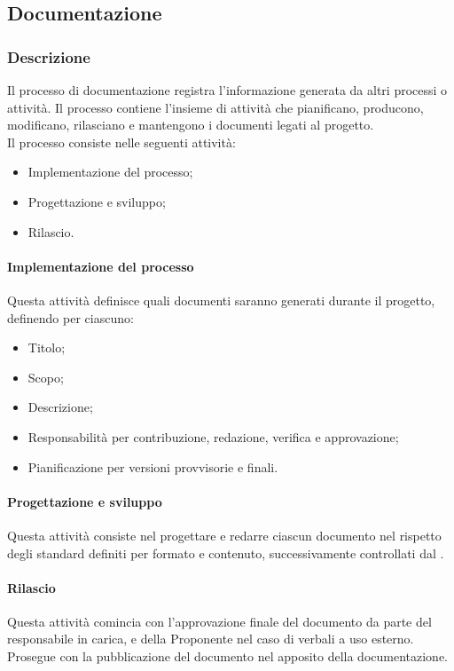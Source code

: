 \subsection{Documentazione}

\subsubsection{Descrizione}
Il processo di documentazione registra l'informazione generata da altri processi o attività. Il processo contiene l'insieme di attività che pianificano, producono, modificano, rilasciano e mantengono i documenti legati al progetto.\\
Il processo consiste nelle seguenti attività:
\begin{itemize}
  \item Implementazione del processo;
  \item Progettazione e sviluppo;
  \item Rilascio.
\end{itemize}

\paragraph{Implementazione del processo}\label{implementazioneprocessodocumentazione}
\par Questa attività definisce quali documenti saranno generati durante il progetto, definendo per ciascuno:
\begin{itemize}
  \item Titolo;
  \item Scopo;
  \item Descrizione;
  \item Responsabilità per contribuzione, redazione, verifica e approvazione;
  \item Pianificazione per versioni provvisorie e finali.
\end{itemize}

\paragraph{Progettazione e sviluppo}
\par Questa attività consiste nel progettare e redarre ciascun documento nel rispetto degli standard definiti per formato e contenuto, successivamente controllati dal \Verificatore{}.

\paragraph{Rilascio}
\par Questa attività comincia con l'approvazione finale del documento da parte del responsabile in carica, e della Proponente nel caso di verbali a uso esterno. Prosegue con la pubblicazione del documento nel  apposito della documentazione.

